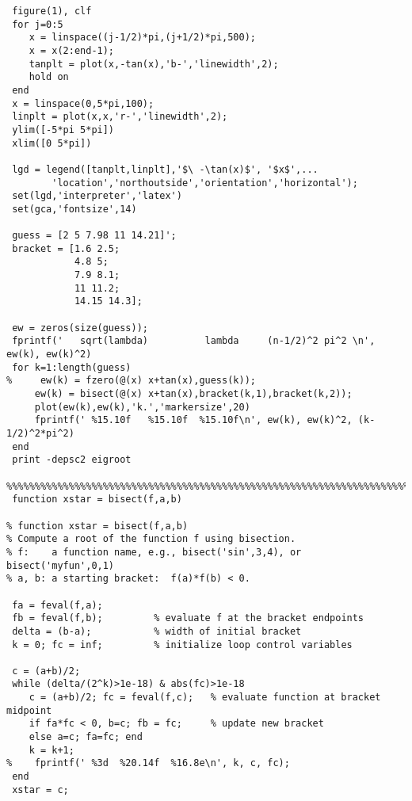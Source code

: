 {\footnotesize\begin{verbatim}
 figure(1), clf
 for j=0:5
    x = linspace((j-1/2)*pi,(j+1/2)*pi,500);
    x = x(2:end-1); 
    tanplt = plot(x,-tan(x),'b-','linewidth',2);
    hold on
 end 
 x = linspace(0,5*pi,100);
 linplt = plot(x,x,'r-','linewidth',2);
 ylim([-5*pi 5*pi])
 xlim([0 5*pi])

 lgd = legend([tanplt,linplt],'$\ -\tan(x)$', '$x$',...
        'location','northoutside','orientation','horizontal');
 set(lgd,'interpreter','latex')
 set(gca,'fontsize',14)

 guess = [2 5 7.98 11 14.21]';
 bracket = [1.6 2.5; 
            4.8 5; 
            7.9 8.1; 
            11 11.2;
            14.15 14.3];

 ew = zeros(size(guess));
 fprintf('   sqrt(lambda)          lambda     (n-1/2)^2 pi^2 \n', ew(k), ew(k)^2)
 for k=1:length(guess)
%     ew(k) = fzero(@(x) x+tan(x),guess(k));
     ew(k) = bisect(@(x) x+tan(x),bracket(k,1),bracket(k,2));
     plot(ew(k),ew(k),'k.','markersize',20)
     fprintf(' %15.10f   %15.10f  %15.10f\n', ew(k), ew(k)^2, (k-1/2)^2*pi^2)
 end
 print -depsc2 eigroot

%%%%%%%%%%%%%%%%%%%%%%%%%%%%%%%%%%%%%%%%%%%%%%%%%%%%%%%%%%%%%%%%%%%%%%%%%%%%%%%%
 function xstar = bisect(f,a,b)

% function xstar = bisect(f,a,b)
% Compute a root of the function f using bisection.
% f:    a function name, e.g., bisect('sin',3,4), or bisect('myfun',0,1)
% a, b: a starting bracket:  f(a)*f(b) < 0.

 fa = feval(f,a);
 fb = feval(f,b);         % evaluate f at the bracket endpoints
 delta = (b-a);           % width of initial bracket
 k = 0; fc = inf;         % initialize loop control variables

 c = (a+b)/2; 
 while (delta/(2^k)>1e-18) & abs(fc)>1e-18
    c = (a+b)/2; fc = feval(f,c);   % evaluate function at bracket midpoint
    if fa*fc < 0, b=c; fb = fc;     % update new bracket
    else a=c; fa=fc; end
    k = k+1;  
%    fprintf(' %3d  %20.14f  %16.8e\n', k, c, fc);
 end
 xstar = c; 
\end{verbatim}}
